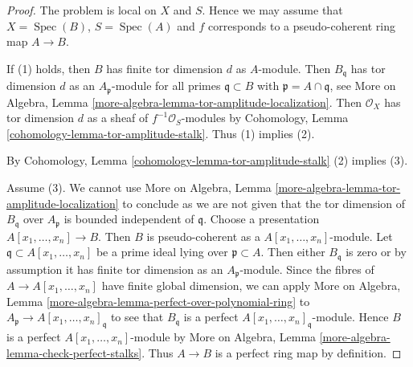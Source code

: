 \documentclass[10pt,a4paper]{amsart}
\theoremstyle{plain}
\theoremstyle{definition}
\theoremstyle{remark}
\numberwithin{equation}{subsection}
\def\Spec{\mathop{\mathrm{Spec}}}
\begin{document}
\begin{proof}
The problem is local on $X$ and $S$. Hence we may assume that
$X = \Spec(B)$, $S = \Spec(A)$ and $f$ corresponds to a pseudo-coherent
ring map $A \to B$.

\medskip\noindent
If (1) holds, then $B$ has finite tor dimension $d$ as $A$-module. Then
$B_\mathfrak q$ has tor dimension $d$ as an $A_\mathfrak p$-module for all
primes $\mathfrak q \subset B$ with $\mathfrak p = A \cap \mathfrak q$, see
More on Algebra, Lemma \ref{more-algebra-lemma-tor-amplitude-localization}.
Then $\mathcal{O}_X$ has tor dimension $d$ as a 
sheaf of $f^{-1}\mathcal{O}_S$-modules by
Cohomology, Lemma \ref{cohomology-lemma-tor-amplitude-stalk}.
Thus (1) implies (2).

\medskip\noindent
By Cohomology, Lemma \ref{cohomology-lemma-tor-amplitude-stalk} (2) implies
(3).

\medskip\noindent
Assume (3). We cannot use
More on Algebra, Lemma \ref{more-algebra-lemma-tor-amplitude-localization}
to conclude as we are not given that the tor dimension of
$B_\mathfrak q$ over $A_\mathfrak p$ is bounded independent of $\mathfrak q$.
Choose a presentation $A[x_1, \ldots, x_n] \to B$. Then $B$ is
pseudo-coherent as a $A[x_1, \ldots, x_n]$-module. Let
$\mathfrak q \subset A[x_1, \ldots, x_n]$ be a prime ideal
lying over $\mathfrak p \subset A$. Then either $B_\mathfrak q$ is zero
or by assumption it has finite tor dimension as an
$A_\mathfrak p$-module. Since the fibres of $A \to A[x_1, \ldots, x_n]$
have finite global dimension, we can apply
More on Algebra, Lemma \ref{more-algebra-lemma-perfect-over-polynomial-ring}
to $A_\mathfrak p \to A[x_1, \ldots, x_n]_\mathfrak q$
to see that $B_\mathfrak q$ is a perfect
$A[x_1, \ldots, x_n]_\mathfrak q$-module. Hence
$B$ is a perfect $A[x_1, \ldots, x_n]$-module by
More on Algebra, Lemma \ref{more-algebra-lemma-check-perfect-stalks}.
Thus $A \to B$ is a perfect ring map by definition.
\end{proof}
\end{document}
